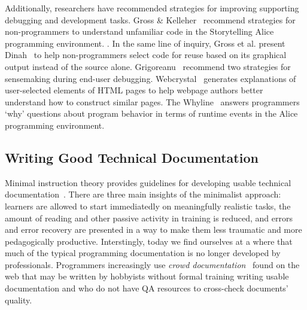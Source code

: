 Additionally, researchers have recommended strategies for improving supporting debugging and development tasks.
Gross \& Kelleher~\cite{gross_non-programmers_2010} recommend strategies for non-programmers to understand unfamiliar code in the Storytelling Alice programming environment.
.
In the same line of inquiry, Gross et al. present Dinah~\cite{gross_dinah_2011} to help non-programmers select code for reuse based on its graphical output instead of the source alone.
Grigoreanu~\cite{grigoreanu_end-user_2012} recommend two strategies for sensemaking during end-user debugging.
Webcrystal~\cite{chang_webcrystal_2012} generates explanations of user-selected elements of HTML pages to help webpage authors better understand how to construct similar pages.
The Whyline~\cite{ko_designing_2004} answers programmers `why' questions about program behavior in terms of runtime events in the Alice programming environment.


\subsection{Writing Good Technical Documentation}

Minimal instruction theory provides guidelines for developing usable technical documentation~\cite{carroll_nurnberg_1990}.
There are three main insights of the minimalist approach:
learners are allowed to start immediatedly on meaningfully realistic tasks,
the amount of reading and other passive activity in training is reduced,
and errors and error recovery are presented in a way to make them less traumatic and more pedagogically productive.
Interstingly, today we find ourselves at a where that much of the typical programming documentation is no longer developed by professionals.
Programmers increasingly use \emph{crowd documentation}~\cite{parnin_measuring_2011} found on the web that may be written by hobbyists without formal training writing usable documentation and who do not have QA resources to cross-check documents' quality.

